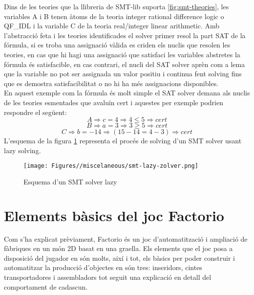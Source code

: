 Dins de les teories que la llibreria de SMT-lib suporta \ref{fig:smt-theories}, les variables A i B tenen àtoms de la teoria integer rational difference logic o QF\_IDL i la variable C  de la teoria real/integer linear arithmetic. Amb l'abstracció feta i les teories identificades el solver primer resol la part SAT de la fórmula, si es troba una assignació vàlida es criden els nuclis que resolen les teories, en cas que hi hagi una assignació que satisfaci les variables abstretes la fórmula és satisfacible, en cas contrari, el nucli del SAT solver aprèn com a lema que la variable no pot ser assignada un valor positiu i continua fent solving fins que es demostra satisfacibilitat o no hi ha més assignacions disponibles.\\
En aquest exemple com la fórmula és molt simple el SAT solver demana als nuclis de les teories esmentades que avaluïn cert i aquestes per exemple podrien respondre el següent:
$$ A \Rightarrow c=4 \Rightarrow 4\le5 \Rightarrow cert $$
$$ B \Rightarrow a=3 \Rightarrow 3\geq5 \Rightarrow cert $$
$$ C \Rightarrow b=-14 \Rightarrow (15-14=4-3) \Rightarrow cert $$
L'esquema de la figura \ref{fig:smt-solver-lazy} representa el procés de solving d'un SMT solver usant lazy solving.
\begin{figure}[H]
    \centering
    \texttt{[image: Figures//miscelaneous/smt-lazy-zolver.png]}
    \caption{Esquema d'un SMT solver lazy \cite{SMT-solving}}
    \label{fig:smt-solver-lazy}
\end{figure}

\section{Elements bàsics del joc Factorio}
Com s'ha explicat prèviament, Factorio és un joc d'automatització i ampliació de fàbriques en un món 2D basat en una graella. Els elements que el joc posa a disposició del jugador en són molts, així i tot, els bàsics per poder construir i automatitzar la producció d'objectes en són tres: inseridors, cintes transportadores i assembladors tot seguit una explicació en detall del comportament de cadascun.

